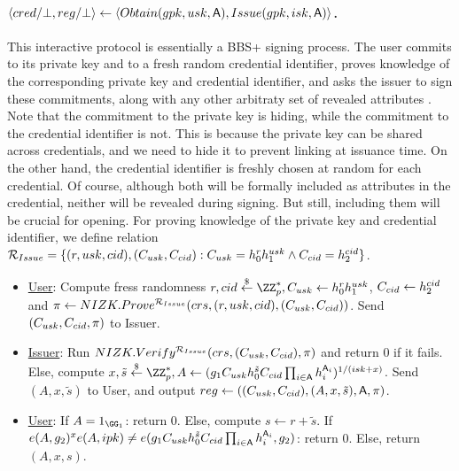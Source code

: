 \paragraph{$\langle cred/\bot,reg/\bot \rangle \gets
  \langle Obtain(gpk,usk,\mathsf{A}),Issue(gpk,isk,\mathsf{A}) \rangle$.} %
This interactive protocol is essentially a BBS+ signing  process. The user
commits to its private key and to a fresh random credential identifier, proves
knowledge of the corresponding private key and credential identifier, and
asks the issuer to sign these commitments, along with any other arbitraty set
of revealed attributes \Attrs. Note that the commitment to the private key is
hiding, while the commitment to the credential identifier is not. This is
because the private key can be shared across credentials, and we need to hide
it to prevent linking at issuance time. On the other hand, the credential
identifier is freshly chosen at random for each credential. Of course, although
both will be formally included as attributes in the credential, neither will be
revealed during signing. But still, including them will be crucial for opening.
For proving knowledge of the private key and credential identifier, we define
relation $\mathcal{R}_{Issue} = \lbrace (r, usk, cid),
(C_{usk},C_{cid}): C_{usk} = h_0^rh_1^{usk} \land C_{cid} =
h_2^{cid}\rbrace$.

\begin{itemize}
\item \underline{User}: Compute fress randomness $r,\credid \getr \ZZ^*_p,
  \Cusk \gets \gen{h}_0^r\gen{h}_1^{\usk}$, $C_{cid} \gets h_2^{cid}$
  and $\pi \gets NIZK.Prove^{\mathcal{R}_{Issue}}(crs,(r,usk,cid),
  (C_{usk},C_{cid}))$. Send $(C_{usk},C_{cid},\pi)$ to Issuer.
\item \underline{Issuer}: Run $NIZK.Verify^{\mathcal{R}_{Issue}}(crs,(C_{usk},
  C_{cid}),\pi)$ and return $0$ if it fails. Else, compute
  $x,\tilde{s} \getr \ZZ^*_p, A \gets
  (\gen{g}_1\Cusk h_0^{\tilde{s}} \Ccredid \prod_{i \in \Attrs}
  \gen{h}_i^{\Attrs_i})^{1/(\isk+x)}$.
  Send $(A,x,\tilde{s})$ to User, and output $reg \gets
  ((C_{usk},C_{cid}),(A,x,\tilde{s}),\mathsf{A},\pi)$.
\item \underline{User}: If $A = 1_{\GG_1}$: return $0$. Else, compute
  $s \gets r + \tilde{s}$. If $e(A,g_2)^xe(A,ipk) \neq
  e(g_1C_{usk}h_0^{\tilde{s}}C_{cid}\prod_{i \in \mathsf{A}}h_i^{\mathsf{A}_i},
  g_2)$: return $0$. Else, return
  $(A,x,s)$.
\end{itemize}

